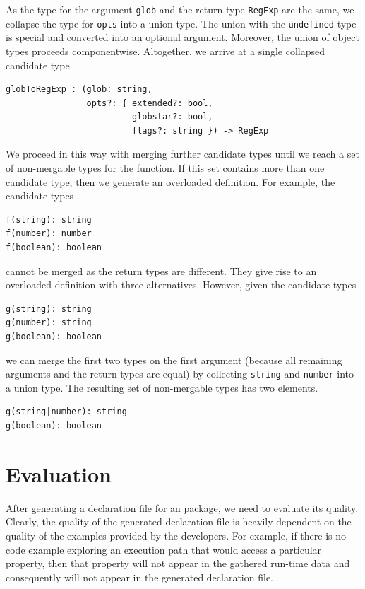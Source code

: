 \documentclass[sigconf]{acmart}
\begin{document}
As the type for the argument \lstinline{glob} and the return type
\lstinline{RegExp} are the same, we collapse the type for
\lstinline{opts} into a union type. The union with the
\lstinline{undefined} type is special and converted into an optional
argument. Moreover, the union of object types proceeds
componentwise. Altogether, we arrive at a single collapsed candidate
type.
\begin{verbatim}
globToRegExp : (glob: string, 
                opts?: { extended?: bool,
                         globstar?: bool,
                         flags?: string }) -> RegExp
\end{verbatim}
We proceed in this way with merging further candidate types until we
reach a set of non-mergable types for the function. If this set
contains more than one candidate type, then we generate an overloaded
definition. For example, the candidate types
\begin{verbatim}
f(string): string
f(number): number
f(boolean): boolean
\end{verbatim}
cannot be merged as the return types are different. They give rise to
an overloaded definition with three alternatives. However, given the candidate types
\begin{verbatim}
g(string): string
g(number): string
g(boolean): boolean
\end{verbatim}
we can merge the first two types on the first argument (because all
remaining arguments and the return types are equal) by collecting \lstinline{string} and
\lstinline{number} into a union type. The resulting set of non-mergable types
has two elements.
\begin{verbatim}
g(string|number): string
g(boolean): boolean
\end{verbatim}

\section{Evaluation}
\label{sec:dts-generate-evaluation}
After generating a declaration file for an \NPM{} package, we need to
evaluate its quality.
Clearly, the quality of the generated
declaration file is heavily dependent on the quality of the examples
provided by the developers. For
example, if there is no code example exploring an execution path that would
access a particular property, then that
property will not appear in the gathered run-time data and
consequently will not appear in the generated declaration file.
\end{document}
